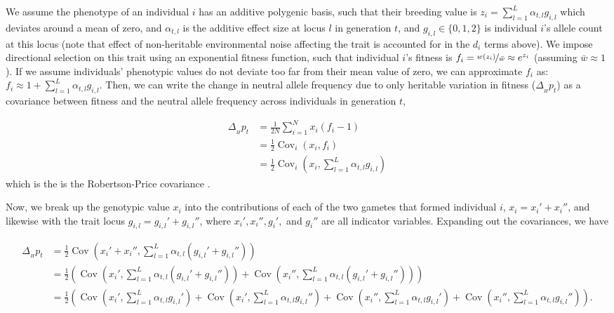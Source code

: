 \documentclass[11pt]{article}
\DeclareMathOperator{\cov}{Cov}
\begin{document}
We assume the phenotype of an individual $i$ has an additive polygenic basis,
such that their breeding value is $z_i = \sum_{l=1}^L \alpha_{t,l} g_{i,l}$
which deviates around a mean of zero, and $\alpha_{t,l}$ is the additive effect
size at locus $l$ in generation $t$, and $g_{i,l} \in \{0,1,2\}$ is individual
$i$'s allele count at this locus (note that effect of non-heritable
environmental noise affecting the trait is accounted for in the $d_i$ terms
above). We impose directional selection on this trait using an exponential
fitness function, such that individual $i$'s fitness is $f_i =
\nicefrac{w(z_i)}{\bar{w}} \approx e^{z_i}$ (assuming $\bar{w} \approx 1$). If
we assume individuals' phenotypic values do not deviate too far from their mean
value of zero, we can approximate $f_i$ as: $f_i \approx 1 + \sum_{l=1}^L
\alpha_{t,l} g_{i,l}$. Then, we can write the change in neutral allele
frequency due to only heritable variation in fitness ($\Delta_{_H} p_t$) as a
covariance between fitness and the neutral allele frequency across individuals
in generation $t$, 

\begin{align}
  \Delta_{_H} p_t &= \frac{1}{2N} \sum_{i=1}^N x_i \left(f_i - 1\right) \\
                  &= \frac{1}{2} \cov_i(x_i, f_i) \\
                  &= \frac{1}{2} \cov_i(x_i, \sum_{l=1}^L \alpha_{t,l} g_{i,l})
  \label{eq:ap-delta-H}
\end{align}
%
which is the is the Robertson-Price covariance
\parencite{Price1970-si,Robertson1966-fs,Lynch1998-wl,Walsh2018-bt}.

Now, we break up the genotypic value $x_i$ into the contributions of each of
the two gametes that formed individual $i$, $x_i = x_i' + x_i''$, and likewise
with the trait locus $g_{i,l} = g_{i,l}' + g_{i,l}''$, where $x_i', x_i'',
g_i',$ and $g_i''$ are all indicator variables. Expanding out the covariances, we have

\begin{align}
  \label{eq:ap-delta-H-2}
  \Delta_{_H} p_t &= \frac{1}{2}\cov(x_i' + x_i'', \sum_{l=1}^L \alpha_{t,l} (g_{i,l}' + g_{i,l}'')) \nonumber \\
                &= \frac{1}{2}\left(\cov(x_i', \sum_{l=1}^L \alpha_{t,l} (g_{i,l}' + g_{i,l}'')) + \cov(x_i'', \sum_{l=1}^L \alpha_{t,l} (g_{i,l}' + g_{i,l}'')) \right) \nonumber \\ 
                &= \frac{1}{2} \left( \cov(x_i', \sum_{l=1}^L \alpha_{t,l} g_{i,l}') + \cov(x_i', \sum_{l=1}^L \alpha_{t,l} g_{i,l}'') + \cov(x_i'', \sum_{l=1}^L \alpha_{t,l} g_{i,l}') + \cov(x_i'', \sum_{l=1}^L \alpha_{t,l} g_{i,l}'') \right).
\end{align}
\end{document}
